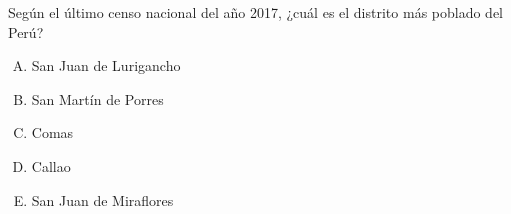 Según el último censo nacional del año 2017, ¿cuál es el distrito más poblado del Perú?
\begin{enumerate}[A)]
	\item San Juan de Lurigancho
	\item San Martín de Porres
	\item Comas
	\item Callao
	\item San Juan de Miraflores
\end{enumerate}